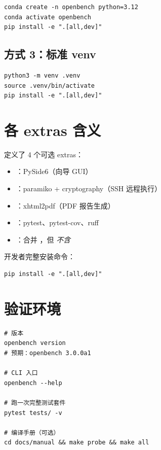 \begin{verbatim}
conda create -n openbench python=3.12
conda activate openbench
pip install -e ".[all,dev]"
\end{verbatim}

\subsection{方式 3：标准 venv}

\begin{verbatim}
python3 -m venv .venv
source .venv/bin/activate
pip install -e ".[all,dev]"
\end{verbatim}

\section{各 extras 含义}

 定义了 4 个可选 extras：

\begin{itemize}
  \item \cli{[gui]}：PySide6（向导 GUI）
  \item \cli{[remote]}：paramiko + cryptography（SSH 远程执行）
  \item \cli{[report]}：xhtml2pdf（PDF 报告生成）
  \item \cli{[dev]}：pytest、pytest-cov、ruff
  \item \cli{[all]}：合并 ，但 \emph{不含} \cli{[dev]}
\end{itemize}

开发者完整安装命令：

\begin{verbatim}
pip install -e ".[all,dev]"
\end{verbatim}


\section{验证环境}

\begin{verbatim}
# 版本
openbench version
# 预期：openbench 3.0.0a1

# CLI 入口
openbench --help

# 跑一次完整测试套件
pytest tests/ -v

# 编译手册（可选）
cd docs/manual && make probe && make all
\end{verbatim}

